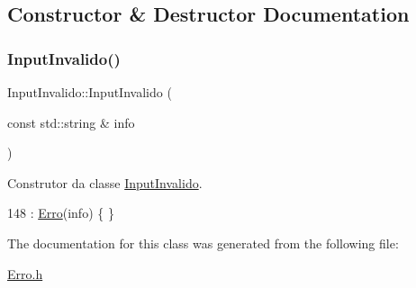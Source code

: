 \subsection{Constructor \& Destructor Documentation}
\mbox{\label{classInputInvalido_aa24dddc4e0de404949099c741266e193}} 
\subsubsection{\texorpdfstring{Input\+Invalido()}{InputInvalido()}}
{\footnotesize\ttfamily Input\+Invalido\+::\+Input\+Invalido (\begin{DoxyParamCaption}\item[{const std\+::string \&}]{info }\end{DoxyParamCaption})\hspace{0.3cm}{\ttfamily [inline]}}



Construtor da classe \hyperlink{classInputInvalido}{Input\+Invalido}. 


\begin{DoxyCode}
148 : \hyperlink{classErro_a15d79796bd17517ff05d45eee55556f1}{Erro}(info) \{ \}
\end{DoxyCode}


The documentation for this class was generated from the following file\+:\begin{DoxyCompactItemize}
\item 
\hyperlink{Erro_8h}{Erro.\+h}\end{DoxyCompactItemize}
